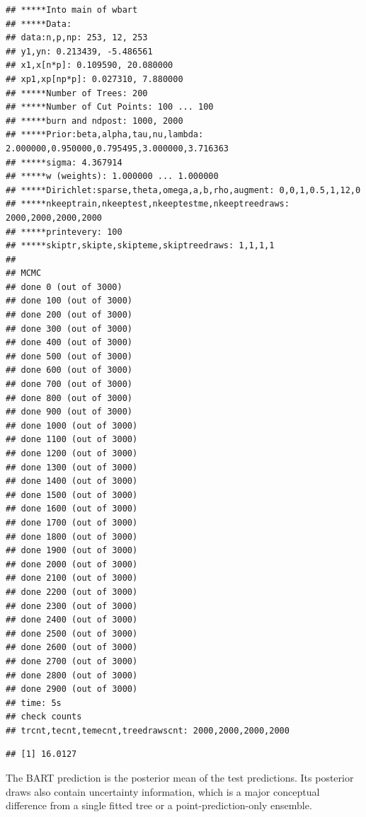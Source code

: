 \documentclass[
  11pt,
]{article}
\newenvironment{Shaded}{\begin{snugshade}}{\end{snugshade}}
\newcommand{\DecValTok}[1]{\textcolor[rgb]{0.00,0.00,0.81}{#1}}
\newcommand{\FunctionTok}[1]{\textcolor[rgb]{0.13,0.29,0.53}{\textbf{#1}}}
\newcommand{\NormalTok}[1]{#1}
\newcommand{\OtherTok}[1]{\textcolor[rgb]{0.56,0.35,0.01}{#1}}
\newcommand{\SpecialCharTok}[1]{\textcolor[rgb]{0.81,0.36,0.00}{\textbf{#1}}}
\begin{document}
\begin{verbatim}
## *****Into main of wbart
## *****Data:
## data:n,p,np: 253, 12, 253
## y1,yn: 0.213439, -5.486561
## x1,x[n*p]: 0.109590, 20.080000
## xp1,xp[np*p]: 0.027310, 7.880000
## *****Number of Trees: 200
## *****Number of Cut Points: 100 ... 100
## *****burn and ndpost: 1000, 2000
## *****Prior:beta,alpha,tau,nu,lambda: 2.000000,0.950000,0.795495,3.000000,3.716363
## *****sigma: 4.367914
## *****w (weights): 1.000000 ... 1.000000
## *****Dirichlet:sparse,theta,omega,a,b,rho,augment: 0,0,1,0.5,1,12,0
## *****nkeeptrain,nkeeptest,nkeeptestme,nkeeptreedraws: 2000,2000,2000,2000
## *****printevery: 100
## *****skiptr,skipte,skipteme,skiptreedraws: 1,1,1,1
## 
## MCMC
## done 0 (out of 3000)
## done 100 (out of 3000)
## done 200 (out of 3000)
## done 300 (out of 3000)
## done 400 (out of 3000)
## done 500 (out of 3000)
## done 600 (out of 3000)
## done 700 (out of 3000)
## done 800 (out of 3000)
## done 900 (out of 3000)
## done 1000 (out of 3000)
## done 1100 (out of 3000)
## done 1200 (out of 3000)
## done 1300 (out of 3000)
## done 1400 (out of 3000)
## done 1500 (out of 3000)
## done 1600 (out of 3000)
## done 1700 (out of 3000)
## done 1800 (out of 3000)
## done 1900 (out of 3000)
## done 2000 (out of 3000)
## done 2100 (out of 3000)
## done 2200 (out of 3000)
## done 2300 (out of 3000)
## done 2400 (out of 3000)
## done 2500 (out of 3000)
## done 2600 (out of 3000)
## done 2700 (out of 3000)
## done 2800 (out of 3000)
## done 2900 (out of 3000)
## time: 5s
## check counts
## trcnt,tecnt,temecnt,treedrawscnt: 2000,2000,2000,2000
\end{verbatim}

\begin{Shaded}
\end{Shaded}

\begin{verbatim}
## [1] 16.0127
\end{verbatim}

The BART prediction is the posterior mean of the test predictions. Its
posterior draws also contain uncertainty information, which is a major
conceptual difference from a single fitted tree or a
point-prediction-only ensemble.
\end{document}
